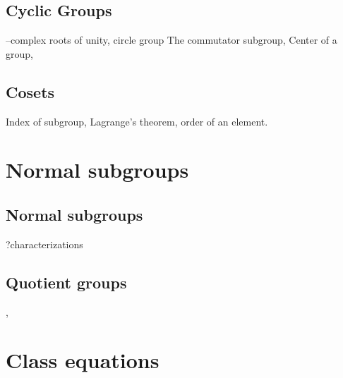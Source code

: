 \section{Cyclic Groups}
--complex roots of unity, circle group
The commutator subgroup, 
Center of a group, 
\section{Cosets}Index of subgroup, Lagrange’s theorem, order of an element.
\chapter{Normal subgroups}
\section{Normal subgroups}
?characterizations
\section{Quotient groups}, 
\chapter{Class equations}
